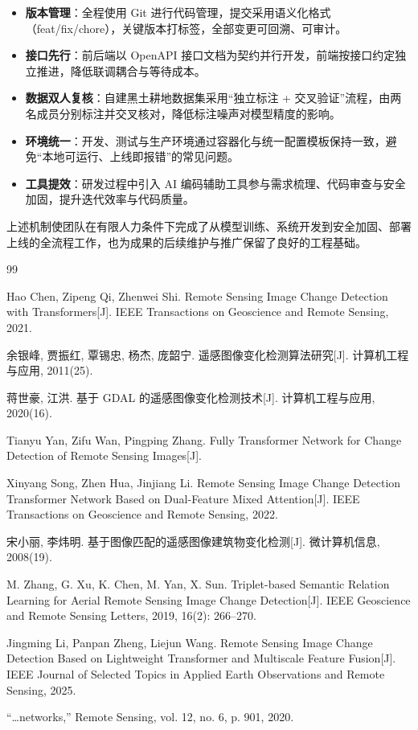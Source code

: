 \documentclass[12pt, a4paper]{ctexart}
\begin{document}
\begin{itemize}
    \item \textbf{版本管理}：全程使用 Git 进行代码管理，提交采用语义化格式（feat/fix/chore），关键版本打标签，全部变更可回溯、可审计。
    \item \textbf{接口先行}：前后端以 OpenAPI 接口文档为契约并行开发，前端按接口约定独立推进，降低联调耦合与等待成本。
    \item \textbf{数据双人复核}：自建黑土耕地数据集采用“独立标注 + 交叉验证”流程，由两名成员分别标注并交叉核对，降低标注噪声对模型精度的影响。
    \item \textbf{环境统一}：开发、测试与生产环境通过容器化与统一配置模板保持一致，避免“本地可运行、上线即报错”的常见问题。
    \item \textbf{工具提效}：研发过程中引入 AI 编码辅助工具参与需求梳理、代码审查与安全加固，提升迭代效率与代码质量。
\end{itemize}

上述机制使团队在有限人力条件下完成了从模型训练、系统开发到安全加固、部署上线的全流程工作，也为成果的后续维护与推广保留了良好的工程基础。

\renewcommand{\refname}{十五、参考文献}

\begin{thebibliography}{99}

 Hao Chen, Zipeng Qi, Zhenwei Shi. Remote Sensing Image Change Detection with Transformers[J]. IEEE Transactions on Geoscience and Remote Sensing, 2021.

 余银峰, 贾振红, 覃锡忠, 杨杰, 庞韶宁. 遥感图像变化检测算法研究[J]. 计算机工程与应用, 2011(25).

 蒋世豪, 江洪. 基于 GDAL 的遥感图像变化检测技术[J]. 计算机工程与应用, 2020(16).

 Tianyu Yan, Zifu Wan, Pingping Zhang. Fully Transformer Network for Change Detection of Remote Sensing Images[J].

 Xinyang Song, Zhen Hua, Jinjiang Li. Remote Sensing Image Change Detection Transformer Network Based on Dual-Feature Mixed Attention[J]. IEEE Transactions on Geoscience and Remote Sensing, 2022.

 宋小丽, 李炜明. 基于图像匹配的遥感图像建筑物变化检测[J]. 微计算机信息, 2008(19).

 M. Zhang, G. Xu, K. Chen, M. Yan, X. Sun. Triplet-based Semantic Relation Learning for Aerial Remote Sensing Image Change Detection[J]. IEEE Geoscience and Remote Sensing Letters, 2019, 16(2): 266--270.

 Jingming Li, Panpan Zheng, Liejun Wang. Remote Sensing Image Change Detection Based on Lightweight Transformer and Multiscale Feature Fusion[J]. IEEE Journal of Selected Topics in Applied Earth Observations and Remote Sensing, 2025.

 ``\ldots networks,'' Remote Sensing, vol. 12, no. 6, p. 901, 2020.

\end{thebibliography}
\end{document}
